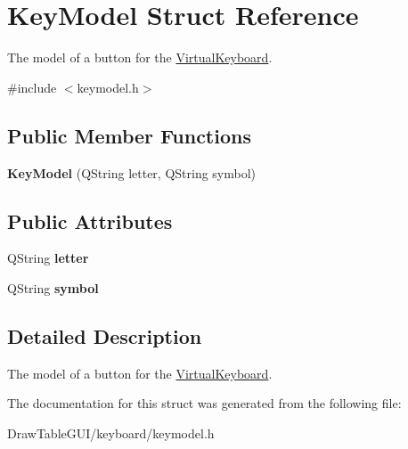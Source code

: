\hypertarget{structKeyModel}{}\section{Key\+Model Struct Reference}
\label{structKeyModel}


The model of a button for the \hyperlink{classVirtualKeyboard}{Virtual\+Keyboard}.  




{\ttfamily \#include $<$keymodel.\+h$>$}

\subsection*{Public Member Functions}
\begin{DoxyCompactItemize}
\item 
\hypertarget{structKeyModel_a0f34aa9df229d4a885b9974a7dd3ab35}{}{\bfseries Key\+Model} (Q\+String letter, Q\+String symbol)\label{structKeyModel_a0f34aa9df229d4a885b9974a7dd3ab35}

\end{DoxyCompactItemize}
\subsection*{Public Attributes}
\begin{DoxyCompactItemize}
\item 
\hypertarget{structKeyModel_a4d455b97a7fb7f3ded1dcfef6bf9a0ad}{}Q\+String {\bfseries letter}\label{structKeyModel_a4d455b97a7fb7f3ded1dcfef6bf9a0ad}

\item 
\hypertarget{structKeyModel_ae94d246639bee4cb849bcb258d880461}{}Q\+String {\bfseries symbol}\label{structKeyModel_ae94d246639bee4cb849bcb258d880461}

\end{DoxyCompactItemize}


\subsection{Detailed Description}
The model of a button for the \hyperlink{classVirtualKeyboard}{Virtual\+Keyboard}. 

The documentation for this struct was generated from the following file\+:\begin{DoxyCompactItemize}
\item 
Draw\+Table\+G\+U\+I/keyboard/keymodel.\+h\end{DoxyCompactItemize}

